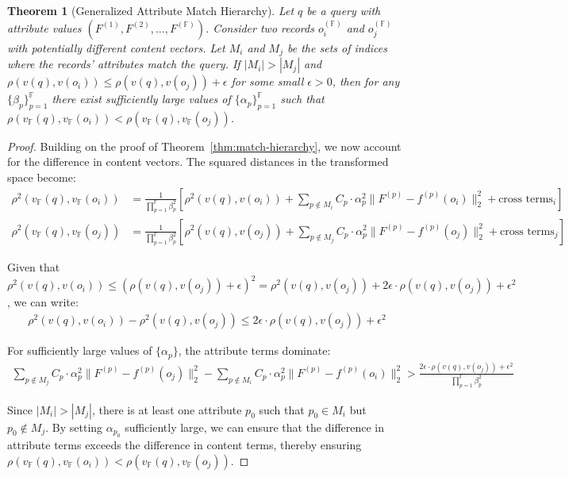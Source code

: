 \documentclass[numbers,sort]{article}
\newtheorem{theorem}{Theorem}
\begin{document}
\begin{theorem}[Generalized Attribute Match Hierarchy]
\label{thm:general-match-hierarchy}
Let $q$ be a query with attribute values $(F^{(1)}, F^{(2)}, \ldots, F^{(\mathbb{F})})$. Consider two records $o_i^{(\mathbb{F})}$ and $o_j^{(\mathbb{F})}$ with potentially different content vectors. Let $M_i$ and $M_j$ be the sets of indices where the records' attributes match the query. If $|M_i| > |M_j|$ and $\rho(v(q), v(o_i)) \leq \rho(v(q), v(o_j)) + \epsilon$ for some small $\epsilon > 0$, then for any $\{\beta_p\}_{p=1}^{\mathbb{F}}$ there exist sufficiently large values of $\{\alpha_p\}_{p=1}^{\mathbb{F}}$ such that $\rho(v_{\mathbb{F}}(q), v_{\mathbb{F}}(o_i)) < \rho(v_{\mathbb{F}}(q), v_{\mathbb{F}}(o_j))$.
\end{theorem}

\begin{proof}
Building on the proof of Theorem~\ref{thm:match-hierarchy}, we now account for the difference in content vectors. The squared distances in the transformed space become:
\begin{align}
\rho^2(v_{\mathbb{F}}(q), v_{\mathbb{F}}(o_i)) &= \frac{1}{\prod_{p=1}^{\mathbb{F}} \beta_p^2} \left[ \rho^2(v(q), v(o_i)) + \sum_{p \notin M_i} C_p \cdot \alpha_p^2 \|F^{(p)} - f^{(p)}(o_i)\|_2^2 + \text{cross terms}_i \right] \\
\rho^2(v_{\mathbb{F}}(q), v_{\mathbb{F}}(o_j)) &= \frac{1}{\prod_{p=1}^{\mathbb{F}} \beta_p^2} \left[ \rho^2(v(q), v(o_j)) + \sum_{p \notin M_j} C_p \cdot \alpha_p^2 \|F^{(p)} - f^{(p)}(o_j)\|_2^2 + \text{cross terms}_j \right]
\end{align}

Given that $\rho^2(v(q), v(o_i)) \leq (\rho(v(q), v(o_j)) + \epsilon)^2 = \rho^2(v(q), v(o_j)) + 2\epsilon \cdot \rho(v(q), v(o_j)) + \epsilon^2$, we can write:
\begin{align}
\rho^2(v(q), v(o_i)) - \rho^2(v(q), v(o_j)) \leq 2\epsilon \cdot \rho(v(q), v(o_j)) + \epsilon^2
\end{align}

For sufficiently large values of $\{\alpha_p\}$, the attribute terms dominate:
\begin{align}
\sum_{p \notin M_j} C_p \cdot \alpha_p^2 \|F^{(p)} - f^{(p)}(o_j)\|_2^2 - \sum_{p \notin M_i} C_p \cdot \alpha_p^2 \|F^{(p)} - f^{(p)}(o_i)\|_2^2 > \frac{2\epsilon \cdot \rho(v(q), v(o_j)) + \epsilon^2}{\prod_{p=1}^{\mathbb{F}} \beta_p^2}
\end{align}

Since $|M_i| > |M_j|$, there is at least one attribute $p_0$ such that $p_0 \in M_i$ but $p_0 \notin M_j$. By setting $\alpha_{p_0}$ sufficiently large, we can ensure that the difference in attribute terms exceeds the difference in content terms, thereby ensuring $\rho(v_{\mathbb{F}}(q), v_{\mathbb{F}}(o_i)) < \rho(v_{\mathbb{F}}(q), v_{\mathbb{F}}(o_j))$.
\end{proof}
\end{document}
